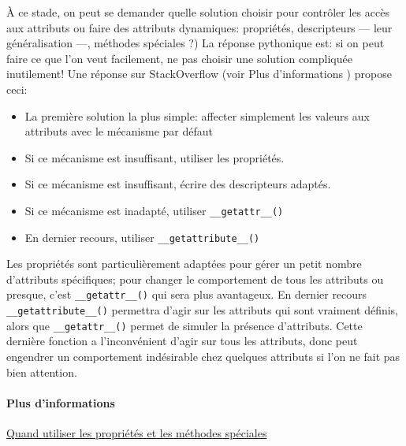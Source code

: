 À ce stade, on peut se demander quelle solution choisir pour contrôler les accès aux attributs ou faire des attributs dynamiques: propriétés, descripteurs --- leur généralisation ---, méthodes spéciales ?) La réponse pythonique est: si on peut faire ce que l'on veut facilement, ne pas choisir une solution compliquée inutilement! Une réponse sur StackOverflow (voir \og Plus d'informations \fg{}) propose ceci:
\begin{itemize}
    \item La première solution la plus simple: affecter simplement les valeurs aux attributs avec le mécanisme par défaut
    \item Si ce mécanisme est insuffisant, utiliser les propriétés.
    \item Si ce mécanisme est insuffisant, écrire des descripteurs adaptés.
    \item Si ce mécanisme est inadapté, utiliser \texttt{__getattr__()}
    \item En dernier recours, utiliser \texttt{__getattribute__()}
\end{itemize}

Les propriétés sont particulièrement adaptées pour gérer un petit nombre d'attributs spécifiques; pour changer le comportement de tous les attributs ou presque, c'est \texttt{__getattr__()} qui sera plus avantageux. En dernier recours \texttt{__getattribute__()} permettra d'agir sur les attributs qui sont vraiment définis, alors que \texttt{__getattr__()} permet de simuler la présence d'attributs. Cette dernière fonction a l'inconvénient d'agir sur tous les attributs, donc peut engendrer un comportement indésirable chez quelques attributs si l'on ne fait pas bien attention.

\paragraph*{Plus d'informations} \href{https://stackoverflow.com/a/22617259/9214306}{Quand utiliser les propriétés et les méthodes spéciales}

